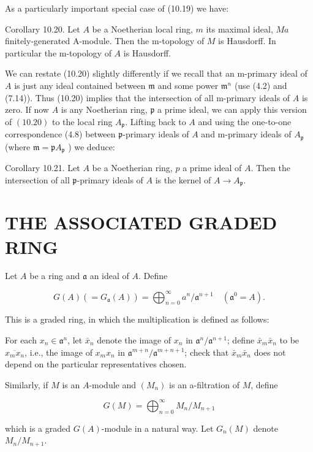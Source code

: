 \documentclass{standalone}
\theoremstyle{definition}
\theoremstyle{remark}
\begin{document}
As a particularly important special case of (10.19) we have:

Corollary 10.20. Let $A$ be a Noetherian local ring, $m$ its maximal ideal, $M a$ finitely-generated A-module. Then the m-topology of $M$ is Hausdorff. In particular the m-topology of $A$ is Hausdorff.

We can restate (10.20) slightly differently if we recall that an m-primary ideal of $A$ is just any ideal contained between $\mathfrak{m}$ and some power $\mathfrak{m}^{n}$ (use (4.2) and (7.14)). Thus (10.20) implies that the intersection of all m-primary ideals of $A$ is zero. If now $A$ is any Noetherian ring, $\mathfrak{p}$ a prime ideal, we can apply this version of $(10.20)$ to the local ring $A_{\mathfrak{p}}$. Lifting back to $A$ and using the one-to-one correspondence (4.8) between $\mathfrak{p}$-primary ideals of $A$ and m-primary ideals of $A_{\mathfrak{p}}$ (where $\mathfrak{m}=\mathfrak{p} A_{\mathfrak{p}}$ ) we deduce:

Corollary 10.21. Let $A$ be a Noetherian ring, $p$ a prime ideal of $A$. Then the intersection of all $\mathfrak{p}$-primary ideals of $A$ is the kernel of $A \rightarrow A_{\mathfrak{p}}$.

\section{THE ASSOCIATED GRADED RING}
Let $A$ be a ring and $\mathfrak{a}$ an ideal of $A$. Define

\[
G(A)\left(=G_{\mathfrak{a}}(A)\right)=\bigoplus_{n=0}^{\infty} a^{n} / \mathfrak{a}^{n+1} \quad\left(\mathfrak{a}^{0}=A\right) .
\]

This is a graded ring, in which the multiplication is defined as follows:

For each $x_{n} \in \mathfrak{a}^{n}$, let $\bar{x}_{n}$ denote the image of $x_{n}$ in $\mathfrak{a}^{n} / \mathfrak{a}^{n+1}$; define $\bar{x}_{m} \bar{x}_{n}$ to be $\overline{x_{m} x_{n}}$, i.e., the image of $x_{m} x_{n}$ in $\mathfrak{a}^{m+n} / \mathfrak{a}^{m+n+1}$; check that $\bar{x}_{m} \bar{x}_{n}$ does not depend on the particular representatives chosen.

Similarly, if $M$ is an $A$-module and $\left(M_{n}\right)$ is an a-filtration of $M$, define

\[
G(M)=\bigoplus_{n=0}^{\infty} M_{n} / M_{n+1}
\]

which is a graded $G(A)$-module in a natural way. Let $G_{n}(M)$ denote $M_{n} / M_{n+1}$.
\end{document}
